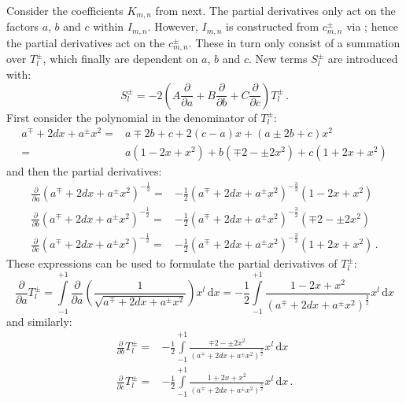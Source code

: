 Consider the coefficients $K_{m,n}$ from  next.
The partial derivatives only act on the factors $a$, $b$ and $c$ within $I_{m,n}$.
However, $I_{m,n}$ is constructed from $c_{m,n}^{\pm}$ via ;
hence the partial derivatives act on the $c_{m,n}^{\pm}$.
These in turn only consist of a summation over $T^{\pm}_l$, which finally are dependent on $a$, $b$ and $c$.
New terms $S^{\pm}_l$ are introduced with:
\begin{equation}
  S^{\pm}_l = -2 \left( A \frac{\partial}{\partial a} + B \frac{\partial}{\partial b} + C \frac{\partial}{\partial c} \right) T^{\pm}_l \, . \label{eqn:def_S_pm_l}
\end{equation}
First consider the polynomial in the denominator of $T^{\pm}_l$:
\begin{align}
  a^{\mp}+2 d x + a^{\pm} x^2
  =& a \mp 2b +c +2 (c-a) x + (a \pm 2 b + c) x^2 \nonumber \\
  =& a \left( 1 -2 x + x^2 \right) + b \left( \mp 2 - \pm 2 x^2 \right) + c \left( 1 +2 x +x^2 \right)
\end{align}
and then the partial derivatives:
\begin{align}
  \frac{\partial}{\partial a} \left( a^{\mp}+2 d x + a^{\pm} x^2 \right)^{-\frac{1}{2}}
  =& -\frac{1}{2} \left( a^{\mp}+2 d x + a^{\pm} x^2 \right)^{-\frac{3}{2}} \left( 1 - 2 x + x^2 \right) \\
  \frac{\partial}{\partial b} \left( a^{\mp}+2 d x + a^{\pm} x^2 \right)^{-\frac{1}{2}}
  =& -\frac{1}{2} \left( a^{\mp}+2 d x + a^{\pm} x^2 \right)^{-\frac{3}{2}} \left( \mp 2 - \pm 2 x^2 \right) \\
  \frac{\partial}{\partial c} \left( a^{\mp}+2 d x + a^{\pm} x^2 \right)^{-\frac{1}{2}}
  =& -\frac{1}{2} \left( a^{\mp}+2 d x + a^{\pm} x^2 \right)^{-\frac{3}{2}} \left( 1 + 2 x + x^2 \right) \, .
\end{align}
These expressions can be used to formulate the partial derivatives of $T^{\pm}_l$:
\begin{equation}
    \frac{\partial}{\partial a} T^{\pm}_l
  = \int\limits_{-1}^{+1} \frac{\partial}{\partial a} \left( \frac{1}{\sqrt{a^{\mp}+2 d x + a^{\pm} x^2}} \right) x^l \,\mathrm{d}x
  = -\frac{1}{2} \int\limits_{-1}^{+1} \frac{1 - 2 x + x^2}{\left( a^{\mp}+2 d x + a^{\pm} x^2 \right)^{\frac{3}{2}}} x^l \,\mathrm{d}x
\end{equation}
and similarly:
\begin{align}
  \frac{\partial}{\partial b} T^{\pm}_l
  =& -\frac{1}{2} \int\limits_{-1}^{+1} \frac{ \mp 2 - \pm 2 x^2}{\left( a^{\mp}+2 d x + a^{\pm} x^2 \right)^{\frac{3}{2}}} x^l \,\mathrm{d}x \\
  \frac{\partial}{\partial c} T^{\pm}_l
  =& -\frac{1}{2} \int\limits_{-1}^{+1} \frac{1 + 2 x + x^2 }{\left( a^{\mp}+2 d x + a^{\pm} x^2 \right)^{\frac{3}{2}}} x^l \,\mathrm{d}x \, .
\end{align}
